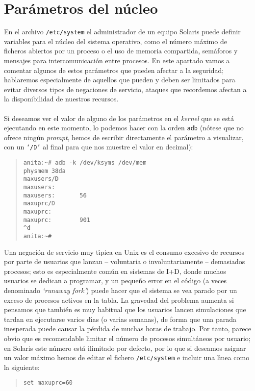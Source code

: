 \section{Par\'ametros del n\'ucleo}
En el archivo {\tt /etc/system} el administrador de un equipo Solaris puede 
definir variables
para el n\'ucleo del sistema operativo, como el n\'umero m\'aximo de ficheros
abiertos por un proceso o el uso de memoria compartida, sem\'aforos y mensajes
para intercomunicaci\'on entre procesos. En este apartado vamos a comentar 
algunos de estos par\'ametros que pueden afectar a la seguridad; hablaremos 
especialmente de aquellos que pueden y deben ser limitados para evitar diversos 
tipos de negaciones de servicio, ataques que recordemos afectan a la 
disponibilidad de nuestros recursos.\\ 
\\Si deseamos ver el valor de alguno de los par\'ametros en el {\it kernel} que 
se est\'a ejecutando en este momento, lo podemos hacer con la orden {\tt adb} 
(n\'otese que no ofrece ning\'un {\it prompt}, hemos de escribir directamente 
el par\'ametro a visualizar, con un {\tt `/D'} al final para que nos muestre el
valor en decimal):
\tt 
\begin{quote}
\begin{verbatim}
anita:~# adb -k /dev/ksyms /dev/mem
physmem 38da
maxusers/D
maxusers:
maxusers:       56
maxuprc/D
maxuprc:
maxuprc:        901
^d
anita:~# 
\end{verbatim}
\end{quote}
\rm
Una negaci\'on de servicio muy t\'{\i}pica en Unix es el consumo excesivo de
recursos por parte de usuarios que lanzan -- voluntaria o involuntariamente --
demasiados procesos; esto es especialmente com\'un en sistemas de I+D, donde
muchos usuarios se dedican a programar, y un peque\~no error en el c\'odigo 
(a veces denominado {\it `runaway fork'}) puede hacer que el sistema se vea 
parado por un exceso de procesos activos en
la tabla. La gravedad del problema aumenta si pensamos que tambi\'en es muy
habitual que los usuarios lancen simulaciones que tardan en ejecutarse varios 
d\'{\i}as (o varias semanas), de forma que una parada inesperada puede causar
la p\'erdida de muchas horas de trabajo. Por tanto, parece obvio que es 
recomendable limitar el n\'umero de procesos simult\'aneos por usuario; en 
Solaris este n\'umero est\'a ilimitado por defecto, por lo que si deseamos 
asignar un valor m\'aximo hemos de editar el fichero {\tt /etc/system} e 
incluir una l\'{\i}nea como la siguiente:
\tt
\begin{quote}
\begin{verbatim}
set maxuprc=60
\end{verbatim}
\end{quote}
